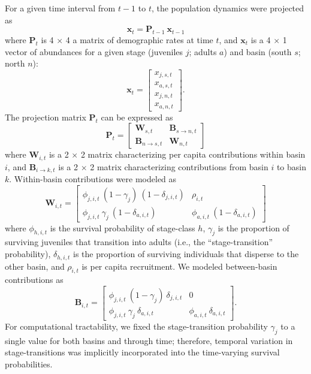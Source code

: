 \documentclass[11pt]{article}
\begin{document}
For a given time interval from $t-1$ to $t$,
the population dynamics were projected as
%
\begin{equation} \label{eq:XPX}
    \mathbf{x}_t = \mathbf{P}_{t-1}~\mathbf{x}_{t-1}
\end{equation}
%
where $\mathbf{P}_{t}$ is 4 $\times$ 4 a matrix of demographic rates at time $t$,
and $\mathbf{x}_{t}$ is a 4 $\times$ 1 vector of abundances
for a given stage (juveniles $j$; adults $a$)
and basin (south $s$; north $n$):
%
\begin{equation} \label{eq:X}
\mathbf{x}_{t} =
\left[
\begin{array}{cccc}
    {x_{j,s,t}} \\
    {x_{a,s,t}} \\
    {x_{j,n,t}} \\
    {x_{a,n,t}}
    \end{array}
\right]
\text{.}
\end{equation}
%
The projection matrix $\mathbf{P}_{t}$ can be expressed as
%
\begin{equation} \label{eq:P}
\mathbf{P}_{t} =
\left[
\begin{array}{c|ccc}
    \mathbf{W}_{s,t}  & \mathbf{B}_{s\rightarrow n,t} \\
    \hline
    \mathbf{B}_{n\rightarrow s,t} & \mathbf{W}_{n,t}
    \end{array}
\right]
\end{equation}
%
where $\mathbf{W}_{i,t}$ is a 2 $\times$ 2 matrix characterizing
per capita contributions within basin $i$,
and $\mathbf{B}_{i\rightarrow k,t}$ is a 2 $\times$ 2 matrix characterizing
contributions from basin $i$ to basin $k$.
Within-basin contributions were modeled as
\begin{equation} \label{eq:W}
\mathbf{W}_{i,t} =
\left[
\begin{array}{cccc}
    \phi_{j,i,t}~(1-\gamma_{j})~(1-\delta_{j,i,t}) &
    \rho_{i,t} \\
    \phi_{j,i,t}~\gamma_{j}~(1-\delta_{a,i,t}) &
    \phi_{a,i,t}~(1-\delta_{a,i,t})
    \end{array}
\right]
\end{equation}
%
where $\phi_{h,i,t}$ is the survival probability of stage-class $h$,
$\gamma_{j}$ is the proportion of surviving juveniles that transition into adults
(i.e., the ``stage-transition'' probability),
$\delta_{h,i,t}$ is the proportion of surviving individuals that disperse to the other basin,
and $\rho_{i,t}$ is per capita recruitment.
We modeled between-basin contributions as
%
\begin{equation} \label{eq:B}
\mathbf{B}_{i,t} =
\left[
\begin{array}{cccc}
    \phi_{j,i,t}~(1 - \gamma_{j})~\delta_{j,i,t} &
    0 \\

    \phi_{j,i,t}~\gamma_{j}~\delta_{a,i,t} &
    \phi_{a,i,t}~\delta_{a,i,t}
    \end{array}
\right].
\end{equation}
%
For computational tractability,
we fixed the stage-transition probability $\gamma_{j}$ to a single value
for both basins and through time;
therefore, temporal variation in stage-transitions was implicitly incorporated
into the time-varying survival probabilities.
\end{document}
